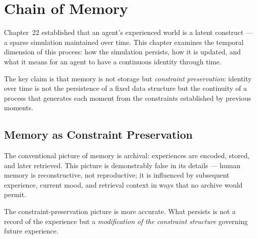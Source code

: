 
\chapter{Chain of Memory}



Chapter~22 established that an agent's experienced world is a latent
construct — a sparse simulation maintained over time. This chapter examines
the temporal dimension of this process: how the simulation persists, how
it is updated, and what it means for an agent to have a continuous identity
through time.

The key claim is that memory is not storage but \emph{constraint
preservation}: identity over time is not the persistence of a fixed data
structure but the continuity of a process that generates each moment from
the constraints established by previous moments.

\section{Memory as Constraint Preservation}

The conventional picture of memory is archival: experiences are encoded,
stored, and later retrieved. This picture is demonstrably false in its
details — human memory is reconstructive, not reproductive; it is
influenced by subsequent experience, current mood, and retrieval context
in ways that no archive would permit.

The constraint-preservation picture is more accurate. What persists is
not a record of the experience but a \emph{modification of the constraint
structure} governing future experience.

